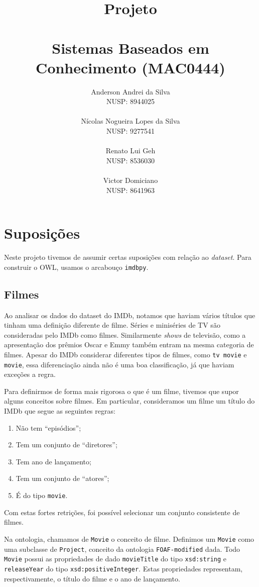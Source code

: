 \documentclass{article}
\title{\Huge Projeto\\~\\\LARGE Sistemas Baseados em Conhecimento (MAC0444)}
\date{}
\author{\Large{Anderson Andrei da Silva}\\\large{NUSP\@: 8944025}\\\\\Large{Nícolas Nogueira Lopes da Silva}\\\large{NUSP\@: 9277541}\\\\\Large{Renato Lui Geh}\\\large{NUSP\@: 8536030}\\\\\Large{Victor Domiciano}\\\large{NUSP\@: 8641963}\\}
\newcommand{\code}[1]{\lstinline[mathescape=true]{#1}}
\begin{document}
\maketitle
\newpage

\section{Suposições}

Neste projeto tivemos de assumir certas suposições com relação ao \textit{dataset}. Para construir
o OWL, usamos o arcabouço \code{imdbpy}.

\subsection{Filmes}

Ao analisar os dados do dataset do IMDb, notamos que haviam vários títulos que tinham uma definição
diferente de filme. Séries e miniséries de TV são consideradas pelo IMDb como filmes. Similarmente
\textit{shows} de televisão, como a apresentação dos prêmios Oscar e Emmy também entram na mesma
categoria de filmes. Apesar do IMDb considerar diferentes tipos de filmes, como \code{tv movie} e
\code{movie}, essa diferenciação ainda não é uma boa classificação, já que haviam exceções a regra.

Para definirmos de forma mais rigorosa o que é um filme, tivemos que supor alguns conceitos sobre
filmes. Em particular, consideramos um filme um título do IMDb que segue as seguintes regras:

\begin{enumerate}
  \item Não tem ``episódios'';
  \item Tem um conjunto de ``diretores'';
  \item Tem ano de lançamento;
  \item Tem um conjunto de ``atores'';
  \item É do tipo \code{movie}.
\end{enumerate}

Com estas fortes retrições, foi possível selecionar um conjunto consistente de filmes.

Na ontologia, chamamos de \code{Movie} o conceito de filme. Definimos um \code{Movie} como uma
subclasse de \code{Project}, conceito da ontologia \code{FOAF-modified} dada. Todo \code{Movie}
possui as propriedades de dado \code{movieTitle} do tipo \code{xsd:string} e \code{releaseYear} do
tipo \code{xsd:positiveInteger}. Estas propriedades representam, respectivamente, o título do
filme e o ano de lançamento.
\end{document}
